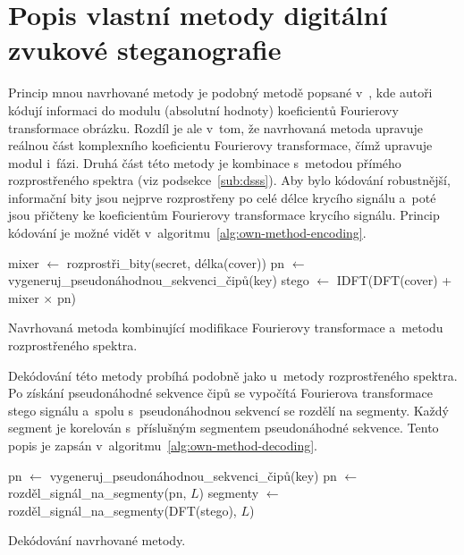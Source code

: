\section{Popis vlastní metody digitální zvukové steganografie}
\label{sec:own-method-proposal}

Princip mnou navrhované metody je podobný metodě popsané v~\cite{Ramkumar1999},
kde autoři kódují informaci do modulu (absolutní hodnoty) koeficientů
Fourierovy transformace obrázku. Rozdíl je ale v~tom, že navrhovaná metoda
upravuje reálnou část komplexního koeficientu Fourierovy transformace, čímž
upravuje modul i~fázi. Druhá část této metody je kombinace s~metodou přímého
rozprostřeného spektra (viz podsekce~\ref{sub:dsss}). Aby bylo kódování
robustnější, informační bity jsou nejprve rozprostřeny po celé délce krycího
signálu a~poté jsou přičteny ke koeficientům Fourierovy transformace krycího
signálu. Princip kódování je možné vidět
v~algoritmu~\ref{alg:own-method-encoding}.

\begin{algorithm}
    \SetNlSty{}{}{:}
    \LinesNumbered
    \DontPrintSemicolon
    \SetInd{0.4em}{1em}
    \SetNlSkip{0.4em}
    \Indm
    \Indp
    \BlankLine
    \SetInd{1em}{1em}
    mixer $\gets$ rozprostři\_bity(secret, délka(cover))\;
    pn $\gets$ vygeneruj\_pseudonáhodnou\_sekvenci\_čipů(key)\;
    stego $\gets$ IDFT(DFT(cover) + mixer $\times$ pn)\;
    \caption{Navrhovaná metoda kombinující modifikace Fourierovy transformace
    a~metodu rozprostřeného spektra.}
    \label{alg:own-method-encoding}
\end{algorithm}

Dekódování této metody probíhá podobně jako u~metody rozprostřeného spektra. Po
získání pseudonáhodné sekvence čipů se vypočítá Fourierova transformace stego
signálu a~spolu s~pseudonáhodnou sekvencí se rozdělí na segmenty. Každý segment
je korelován s~příslušným segmentem pseudonáhodné sekvence. Tento popis je
zapsán v~algoritmu~\ref{alg:own-method-decoding}.

\begin{algorithm}
    \SetNlSty{}{}{:}
    \LinesNumbered
    \DontPrintSemicolon
    \SetInd{0.4em}{1em}
    \SetNlSkip{0.4em}
    \Indm
    \Indp
    \BlankLine
    \SetInd{1em}{1em}
    pn $\gets$ vygeneruj\_pseudonáhodnou\_sekvenci\_čipů(key)\;
    pn $\gets$ rozděl\_signál\_na\_segmenty(pn, $L$)\;
    segmenty $\gets$ rozděl\_signál\_na\_segmenty(DFT(stego), $L$)\;
    \caption{Dekódování navrhované metody.}
    \label{alg:own-method-decoding}
\end{algorithm}



